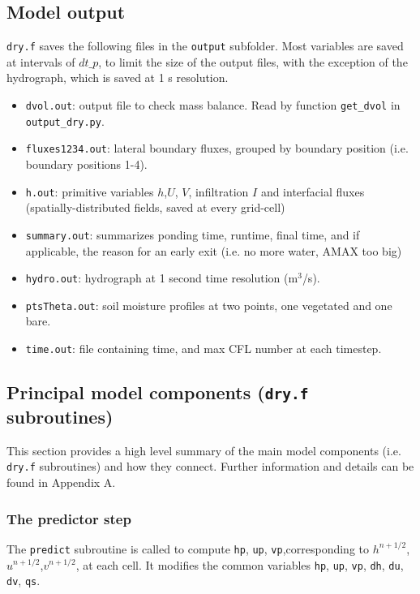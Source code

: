 \documentclass{article}
\newcommand{\code}[1]{\texttt{#1}}
\begin{document}
\subsection{Model output}

 \code{dry.f} saves the following  files in the \code{output} subfolder.
Most variables are saved at intervals of  $dt\_p$, to limit the size of the output files, with the exception of the hydrograph, which is saved at 1 s resolution.   
\begin{itemize}
	\item \code{dvol.out}:  output file to check mass balance. Read by function \code{get\_dvol} in \code{output\_dry.py}.
	\item \code{fluxes1234.out}: lateral boundary fluxes, grouped by boundary  position (i.e. boundary positions 1-4).  
	\item \code{h.out}: primitive variables $h$,$U$, $V$, infiltration $I$ and interfacial fluxes (spatially-distributed fields, saved at every grid-cell)
	\item \code{summary.out}: summarizes ponding time, runtime, final time, and if applicable, the reason for an early exit (i.e. no more water, AMAX too big) 
	\item \code{hydro.out}: hydrograph at 1 second time resolution (m$^3$/s).  
	\item \code{ptsTheta.out}: soil moisture profiles at two points, one vegetated and one bare. 
	\item \code{time.out}: file containing time, and max CFL number at each timestep.
\end{itemize}

\subsection{Principal model components (\code{dry.f} subroutines)}

This section provides a high level summary of the main model components (i.e. \code{dry.f} subroutines) and how they connect.  Further information and details can be found in Appendix A.

\subsubsection*{The predictor step}

The \code{predict} subroutine is called to compute \code{hp}, \code{up},  \code{vp},corresponding to $h^{n+1/2}$,$u^{n+1/2}$,$v^{n+1/2}$, at each cell.   It modifies the common variables  \code{hp}, \code{up},  \code{vp}, \code{dh}, \code{du}, \code{dv}, \code{qs}.
\end{document}
